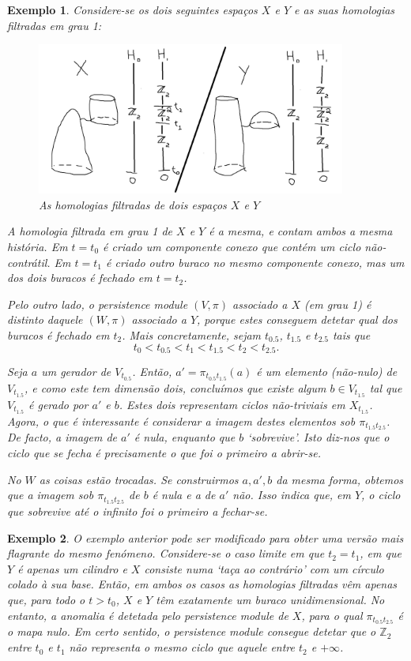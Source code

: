 \documentclass[11pt]{article}
\newtheorem{ex}{Exemplo}
\theoremstyle{nonumberplain}
\newcommand{\Z}{\mathbb{Z}}
\begin{document}
\begin{ex}\label{exxy}
Considere-se os dois seguintes espaços $X$ e $Y$ e as suas homologias filtradas em grau 1:
\begin{figure}[H]
\centering
\includegraphics[height=5cm]{mt2}
\caption{As homologias filtradas de dois espaços $X$ e $Y$}\label{mt2}
\end{figure}

A homologia filtrada em grau 1 de $X$ e $Y$ é a mesma, e contam ambos a mesma história. Em $t = t_0$ é criado um componente conexo que contém um ciclo não-contrátil. Em $t = t_1$ é criado outro buraco no mesmo componente conexo, mas um dos dois buracos é fechado em $t = t_2$.

Pelo outro lado, o persistence module $(V,\pi)$ associado a $X$ (em grau 1) é distinto daquele $(W,\pi)$ associado a $Y$, porque estes conseguem detetar qual dos buracos é fechado em $t_2$. Mais concretamente, sejam $t_{0.5}$, $t_{1.5}$ e $t_{2.5}$ tais que
\[t_0 < t_{0.5} < t_1 < t_{1.5} < t_2 < t_{2.5}.\]

Seja $a$ um gerador de $V_{t_{0.5}}$. Então, $a' = \pi_{t_{0.5} t_{1.5}}(a)$ é um elemento (não-nulo) de $V_{t_{1.5}}$, e como este tem dimensão dois, concluímos que existe algum $b \in V_{t_{1.5}}$ tal que $V_{t_{1.5}}$ é gerado por $a'$ e $b$. Estes dois representam ciclos não-triviais em $X_{t_{1.5}}$. Agora, o que é interessante é considerar a imagem destes elementos sob $\pi_{t_{1.5} t_{2.5}}$. De facto, a imagem de $a'$ é nula, enquanto que $b$ `sobrevive'. Isto diz-nos que o ciclo que se fecha é precisamente o que foi o primeiro a abrir-se.

No $W$ as coisas estão trocadas. Se construirmos $a, a', b$ da mesma forma, obtemos que a imagem sob $\pi_{t_{1.5} t_{2.5}}$ de $b$ é nula e a de $a'$ não. Isso indica que, em $Y$, o ciclo que sobrevive até o infinito foi o primeiro a fechar-se.
\end{ex}

\begin{ex}
O exemplo anterior pode ser modificado para obter uma versão mais flagrante do mesmo fenómeno. Considere-se o caso limite em que $t_2 = t_1$, em que $Y$ é apenas um cilindro e $X$ consiste numa `taça ao contrário' com um círculo colado à sua base. Então, em ambos os casos as homologias filtradas vêm apenas que, para todo o $t > t_0$, $X$ e $Y$ têm exatamente um buraco unidimensional. No entanto, a anomalia é detetada pelo persistence module de $X$, para o qual $\pi_{t_{0.5} t_{2.5}}$ é o mapa nulo. Em certo sentido, o persistence module consegue detetar que o $\Z_2$ entre $t_0$ e $t_1$ não representa o mesmo ciclo que aquele entre $t_2$ e $+\infty$.
\end{ex}
\end{document}
